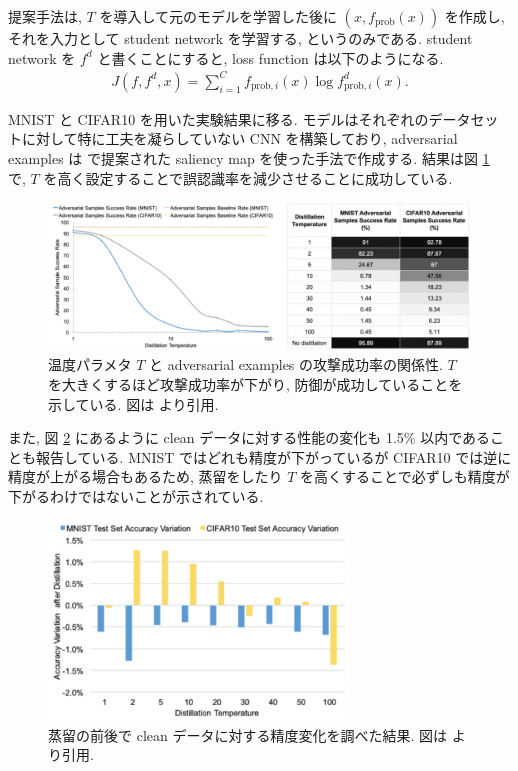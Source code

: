 提案手法は, $T$ を導入して元のモデルを学習した後に $(x, f_{\text{prob}} (x))$ を作成し, それを入力として student network を学習する, というのみである.
student network を $f^d$ と書くことにすると, loss function は以下のようになる.
%
\begin{eqnarray}
J(f, f^d, x) = \sum_{i = 1}^{C} f_{\text{prob}, i} (x) \log f^d_{\text{prob}, i} (x).
\label{eq:distillation-as-loss}
\end{eqnarray}
%

MNIST と CIFAR10 を用いた実験結果に移る.
モデルはそれぞれのデータセットに対して特に工夫を凝らしていない CNN を構築しており, adversarial examples は \cite{papernot2016limitations} で提案された saliency map を使った手法で作成する.
結果は図 \ref{fig:distillation-as-result-table} で, $T$ を高く設定することで誤認識率を減少させることに成功している.
%
\begin{figure}[htbp]
\begin{center}
\includegraphics[width=16.0cm]{figures/distillation-as-result-table.pdf}
\end{center}
\caption{
温度パラメタ $T$ と adversarial examples の攻撃成功率の関係性.
$T$ を大きくするほど攻撃成功率が下がり, 防御が成功していることを示している.
図は \cite{papernot2016distillation} より引用.
}
\label{fig:distillation-as-result-table}
\end{figure}
%

また, 図 \ref{fig:distillation-as-diff} にあるように clean データに対する性能の変化も 1.5\% 以内であることも報告している.
MNIST ではどれも精度が下がっているが CIFAR10 では逆に精度が上がる場合もあるため, 蒸留をしたり $T$ を高くすることで必ずしも精度が下がるわけではないことが示されている.
%
\begin{figure}[htbp]
\begin{center}
\includegraphics[width=8.0cm]{figures/distillation-as-diff.pdf}
\end{center}
\caption{
蒸留の前後で clean データに対する精度変化を調べた結果.
図は \cite{papernot2016distillation} より引用.
}
\label{fig:distillation-as-diff}
\end{figure}

